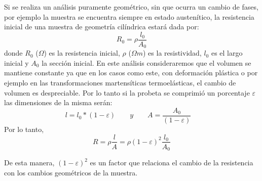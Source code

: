 \documentclass[a4paper,12pt,fleqn,twoside,openany]{book}
\begin{document}
Si se realiza un análisis puramente geométrico, sin que ocurra un cambio de fases, por ejemplo la muestra se encuentra siempre en estado austenítico, la resistencia inicial de una muestra de geometría cilíndrica estará dada por:
\begin{equation}
 R_0= \rho \frac{l_0}{A_0}
\end{equation}
donde $R_0$ ($\Omega$) es la resistencia inicial, $\rho$ ($\Omega m$) es la resistividad, $l_0$ es el largo inicial y $A_0$ la sección inicial. En este análisis consideraremos que el volumen se mantiene constante ya que en los casos como este, con deformación plástica o por ejemplo en las transformaciones martensíticas termoelásticas, el cambio de volumen es despreciable. Por lo tanto si la probeta se comprimió un porcentaje $\varepsilon$ las dimensiones de la misma serán: 
\begin{equation*}
 l=l_0 * (1- \varepsilon)
  \quad \quad y \quad \quad  
 A=\frac{A_0}{(1- \varepsilon)} \quad 
\end{equation*}
Por lo tanto, 
\begin{equation}
R= \rho \frac{l}{A} = \rho (1-\varepsilon)^2 \frac{l_0}{A_0} %
\end{equation}

De esta manera, $(1-\varepsilon)^2$ es un factor que relaciona el cambio de la resistencia con los cambios geométricos de la muestra. 
\end{document}
